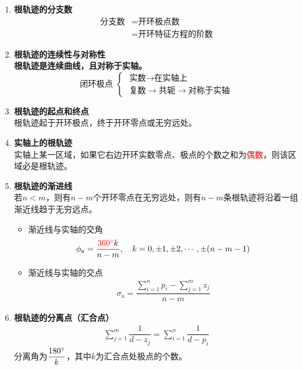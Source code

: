 \begin{enumerate}
	\item \textbf{根轨迹的分支数}
	\begin{align*}
		\mbox{分支数} &= \mbox{开环极点数}\\
		&=\mbox{开环特征方程的阶数}
	\end{align*}
	\item \textbf{根轨迹的连续性与对称性}\\
	\textbf{根轨迹是连续曲线，且对称于实轴。}
	\begin{equation*}
		\mbox{闭环极点} \,\,
		\begin{cases}
			\,\,\mbox{实数} \longrightarrow \mbox{在实轴上}\\
			\,\,\mbox{复数} \longrightarrow \mbox{共轭} \longrightarrow \mbox{对称于实轴}
		\end{cases}
	\end{equation*}
	
	\item \textbf{根轨迹的起点和终点}\\
	根轨迹起于开环极点，终于开环零点或无穷远处。\\
	
	\item \textbf{实轴上的根轨迹}\\
	实轴上某一区域，如果它右边开环实数零点、极点的个数之和为\textcolor{red}{偶数}，则该区域必是根轨迹。
	
	\item \textbf{根轨迹的渐进线}\\
	若$n < m$，则有$n - m$个开环零点在无穷远处，则有$n - m$条根轨迹将沿着一组渐近线趋于无穷远点。
	\begin{itemize}
		\item 渐近线与实轴的交角
		\begin{align}
			\phi_\text{a} = \dfrac{\textcolor{red}{360 {}^{\circ}} k}{n-m}, \quad k = 0,\pm 1,\pm 2, \cdots,\pm (n-m-1)
		\end{align}
		\item 渐近线与实轴的交点
		\begin{align}
			\sigma_\text{a} = \dfrac{\displaystyle \sum_{i =1}^n p_i - \sum_{j = 1}^m z_j}{n-m}
		\end{align}
	\end{itemize}
	
	\item \textbf{根轨迹的分离点（汇合点）}
		\begin{align}
			\sum_{j = 1}^{m} \dfrac{1}{d - z_j} = \sum_{i =1}^{n}\dfrac{1}{d - p_i}
		\end{align}
		分离角为$\dfrac{180 {}^{\circ}}{k}$，其中$k$为汇合点处极点的个数。
	

\end{enumerate}

